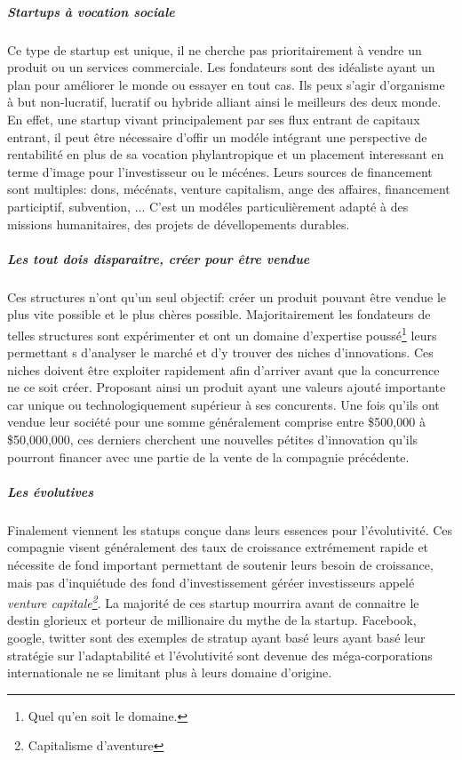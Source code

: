 \documentclass[11pt, a4paper ]{article}
\begin{document}
\begin{spacing}{1.5}
			\subparagraph{Startups à vocation sociale} %
Ce type de startup est unique, il ne cherche pas prioritairement à vendre un produit ou un services commerciale. Les fondateurs sont des idéaliste ayant un plan pour améliorer le monde ou essayer en tout cas.
Ils peux s'agir d'organisme à but non-lucratif, lucratif ou hybride alliant ainsi le meilleurs des deux monde.
En effet, une startup vivant principalement par ses flux entrant de capitaux entrant, il peut être nécessaire d'offir un modéle intégrant une perspective de rentabilité en plus de sa vocation phylantropique et un placement interessant en terme d'image pour l'investisseur ou le mécénes. Leurs sources de financement sont  multiples: dons, mécénats, venture capitalism, ange des affaires, financement participtif, subvention, ...
C'est un modéles particulièrement adapté à des missions humanitaires, des projets de dévellopements durables.


			\subparagraph{Les \emph{tout dois disparaitre}, créer pour être vendue} %
Ces structures n'ont qu'un seul objectif: créer un produit pouvant être vendue le plus vite possible et le plus chères possible. Majoritairement les fondateurs de telles structures sont expérimenter et ont un domaine d'expertise poussé\footnote{Quel qu'en soit le domaine.} leurs permettant s d'analyser le marché et d'y trouver des niches d'innovations. Ces niches doivent être exploiter rapidement afin d'arriver avant que la concurrence ne ce soit créer. Proposant ainsi un produit ayant une valeurs ajouté importante car unique ou technologiquement supérieur à ses concurents. Une fois qu'ils ont vendue leur société pour une somme généralement comprise entre \$500,000 à \$50,000,000, ces derniers cherchent une nouvelles pétites d'innovation qu'ils pourront financer avec une partie de la vente de la compagnie précédente.

			\subparagraph{Les évolutives} %
Finalement viennent les statups conçue dans leurs essences pour l'évolutivité. Ces compagnie visent généralement des taux de croissance extrémement rapide et nécessite de fond important permettant de soutenir leurs besoin de croissance, mais pas d'inquiétude des fond d'investissement géréer investisseurs appelé \emph{venture capitale\footnote{Capitalisme d'aventure}}. La majorité de ces startup mourrira avant de connaitre le destin glorieux et porteur de millionaire du mythe de la startup. Facebook, google, twitter sont des exemples de stratup ayant basé leurs ayant basé leur stratégie sur l'adaptabilité et l'évolutivité sont devenue des méga-corporations internationale ne se limitant plus à leurs domaine d'origine.


\end{spacing}
\end{document}
